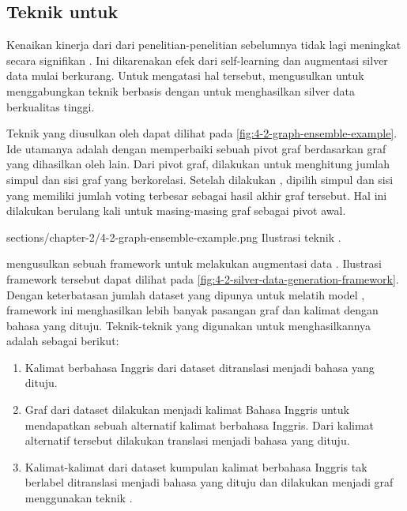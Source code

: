 \subsection{Teknik  untuk \amrparsing{}}

Kenaikan kinerja dari \amrparsing{} dari penelitian-penelitian sebelumnya tidak lagi meningkat secara signifikan .
Ini dikarenakan efek dari self-learning dan augmentasi silver data mulai berkurang.
Untuk mengatasi hal tersebut, \textcite{lee2022} mengusulkan untuk menggabungkan teknik  berbasis \SMATCH{}  dengan  untuk menghasilkan silver data berkualitas tinggi.

Teknik  yang diusulkan oleh \textcite{hoang2021} dapat dilihat pada \cref{fig:4-2-graph-ensemble-example}.
Ide utamanya adalah dengan memperbaiki sebuah pivot graf berdasarkan graf yang dihasilkan oleh  lain.
Dari pivot graf, dilakukan  untuk menghitung jumlah simpul dan sisi graf yang berkorelasi.
Setelah dilakukan , dipilih simpul dan sisi yang memiliki jumlah voting terbesar sebagai hasil akhir graf tersebut.
Hal ini dilakukan berulang kali untuk masing-masing graf sebagai pivot awal.

  {sections/chapter-2/4-2-graph-ensemble-example.png}
  {Ilustrasi teknik  .}

\textcite{lee2022} mengusulkan sebuah framework untuk melakukan augmentasi data \AMR{}.
Ilustrasi framework tersebut dapat dilihat pada \cref{fig:4-2-silver-data-generation-framework}.
Dengan keterbatasan jumlah dataset yang dipunya untuk melatih model \crosslingual{}, framework ini menghasilkan lebih banyak pasangan graf \AMR{} dan kalimat dengan bahasa yang dituju.
Teknik-teknik yang digunakan untuk menghasilkannya adalah sebagai berikut:
\begin{enumerate}
  \item Kalimat berbahasa Inggris dari dataset \AMR{} ditranslasi menjadi bahasa yang dituju.

  \item Graf \AMR{} dari dataset \AMR{} dilakukan  menjadi kalimat Bahasa Inggris untuk mendapatkan sebuah alternatif kalimat berbahasa Inggris.
  Dari kalimat alternatif tersebut dilakukan translasi menjadi bahasa yang dituju.

  \item Kalimat-kalimat dari dataset kumpulan kalimat berbahasa Inggris tak berlabel ditranslasi menjadi bahasa yang dituju dan dilakukan  menjadi graf \AMR{} menggunakan teknik .
\end{enumerate}


